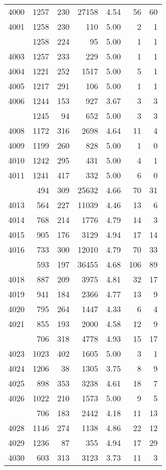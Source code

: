 \documentclass[
]{article}
\begin{document}
\begin{table}
\begin{tabular}[t]{lrrrrrr}
4000 & 1257 & 230 & 27158 & 4.54 & 56 & 60\\
4001 & 1258 & 230 & 110 & 5.00 & 2 & 1\\
\addlinespace
4002 & 1258 & 224 & 95 & 5.00 & 1 & 1\\
4003 & 1257 & 233 & 229 & 5.00 & 1 & 1\\
4004 & 1221 & 252 & 1517 & 5.00 & 5 & 1\\
4005 & 1217 & 291 & 106 & 5.00 & 1 & 1\\
4006 & 1244 & 153 & 927 & 3.67 & 3 & 3\\
\addlinespace
4007 & 1245 & 94 & 652 & 5.00 & 3 & 3\\
4008 & 1172 & 316 & 2698 & 4.64 & 11 & 4\\
4009 & 1199 & 260 & 828 & 5.00 & 1 & 0\\
4010 & 1242 & 295 & 431 & 5.00 & 4 & 1\\
4011 & 1241 & 417 & 332 & 5.00 & 6 & 0\\
\addlinespace
4012 & 494 & 309 & 25632 & 4.66 & 70 & 31\\
4013 & 564 & 227 & 11039 & 4.46 & 13 & 6\\
4014 & 768 & 214 & 1776 & 4.79 & 14 & 3\\
4015 & 905 & 176 & 3129 & 4.94 & 17 & 14\\
4016 & 733 & 300 & 12010 & 4.79 & 70 & 33\\
\addlinespace
4017 & 593 & 197 & 36455 & 4.68 & 106 & 89\\
4018 & 887 & 209 & 3975 & 4.81 & 32 & 17\\
4019 & 941 & 184 & 2366 & 4.77 & 13 & 9\\
4020 & 795 & 264 & 1447 & 4.33 & 6 & 4\\
4021 & 855 & 193 & 2000 & 4.58 & 12 & 9\\
\addlinespace
4022 & 706 & 318 & 4778 & 4.93 & 15 & 17\\
4023 & 1023 & 402 & 1605 & 5.00 & 3 & 1\\
4024 & 1206 & 38 & 1305 & 3.75 & 8 & 9\\
4025 & 898 & 353 & 3238 & 4.61 & 18 & 7\\
4026 & 1022 & 210 & 1573 & 5.00 & 9 & 5\\
\addlinespace
4027 & 706 & 183 & 2442 & 4.18 & 11 & 13\\
4028 & 1146 & 274 & 1138 & 4.86 & 22 & 12\\
4029 & 1236 & 87 & 355 & 4.94 & 17 & 29\\
4030 & 603 & 313 & 3123 & 3.73 & 11 & 3\\

\end{tabular}
\end{table}
\end{document}
